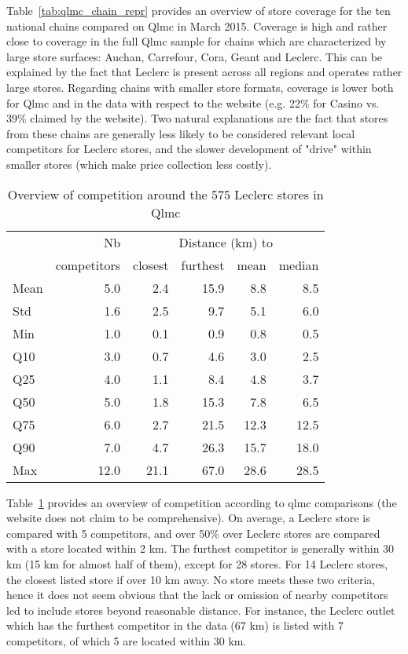 \documentclass[english]{article}
\begin{document}
Table~\ref{tab:qlmc_chain_repr} provides an overview of store coverage for the ten national chains compared on Qlmc in March 2015. Coverage is high and rather close to coverage in the full Qlmc sample for chains which are characterized by large store surfaces: Auchan, Carrefour, Cora, Geant and Leclerc. This can be explained by the fact that Leclerc is present across all regions and operates rather large stores. Regarding chains with smaller store formats, coverage is lower both for Qlmc and in the data with respect to the website (e.g. 22\% for Casino vs. 39\% claimed by the website). Two natural explanations are the fact that stores from these chains are generally less likely to be considered relevant local competitors for Leclerc stores, and the slower development of "drive" within smaller stores (which make price collection less costly).

\begin{table}[H]
\renewcommand{\arraystretch}{0.7}%
\caption{Overview of competition around the 575 Leclerc stores in Qlmc}\label{tab:qlmc_comp}
\small
\begin{tabular}{lr|rrrr}
\toprule
\toprule
{}         & Nb          &    \multicolumn{4}{c}{Distance (km) to} \\
{}         & competitors &    closest & furthest & mean & median \\
\midrule
Mean  &   5.0 &   2.4 &  15.9 &   8.8 &     8.5 \\
Std   &   1.6 &   2.5 &   9.7 &   5.1 &     6.0 \\
Min   &   1.0 &   0.1 &   0.9 &   0.8 &     0.5 \\
Q10   &   3.0 &   0.7 &   4.6 &   3.0 &     2.5 \\
Q25   &   4.0 &   1.1 &   8.4 &   4.8 &     3.7 \\
Q50   &   5.0 &   1.8 &  15.3 &   7.8 &     6.5 \\
Q75   &   6.0 &   2.7 &  21.5 &  12.3 &    12.5 \\
Q90   &   7.0 &   4.7 &  26.3 &  15.7 &    18.0 \\
Max   &  12.0 &  21.1 &  67.0 &  28.6 &    28.5 \\
\bottomrule
\bottomrule
\end{tabular}
\end{table}

Table~\ref{tab:qlmc_comp} provides an overview of competition according to qlmc comparisons (the website does not claim to be comprehensive). On average, a Leclerc store is compared with 5 competitors, and over 50\% over Leclerc stores are compared with a store located within 2 km. The furthest competitor is generally within 30 km (15 km for almost half of them), except for 28 stores. For 14 Leclerc stores, the closest listed store if over 10 km away. No store meets these two criteria, hence it does not seem obvious that the lack or omission of nearby competitors led to include stores beyond reasonable distance. For instance, the Leclerc outlet which has the furthest competitor in the data (67 km) is listed with 7 competitors, of which 5 are located within 30 km.
\end{document}

